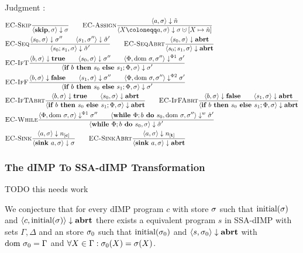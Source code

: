 \\
Judgment :
\begin{align*}
    &\bsrule{EC-Skip}{}{\bigstep{\skipcmd}{\store}{\store}}\qquad
    \bsrule{EC-Assign}{\bigstep{a}{\store}{\flaggedn{}}}
    {\bigstep{\defaultstore}{\store}{\storeassign{\store}{X \mapsto \flaggedn{}}}} \\
    &\bsrule{EC-Seq}{\bigstep{s_0}{\sigma}{\store''} \qquad \bigstep{s_1}{\store''}{\excstore'}}
    {\bigstep{\defaultssaseq}{\store}{\excstore'}}\qquad
    \bsrule{EC-SeqAbrt}{\bigstep{s_0}{\sigma}{\exception}}
    {\bigstep{\defaultssaseq}{\store}{\exception}} \\
    &\bsrule{EC-IfT}{\bigstep{b}{\store}{\btrue}\qquad \bigstep{s_0}{\store}{\store''}
    \qquad \bigsteppl{\philist}{\dom\store}{\store''}{\store'}}
    {\bigstep{\defaultssaif}{\store}{\store'}}\\
    &\bsrule{EC-IfF}{\bigstep{b}{\store}{\bfalse}\qquad \bigstep{s_1}{\store}{\store''}
    \qquad \bigsteppr{\philist}{\dom\store}{\store''}{\store'}}
    {\bigstep{\defaultssaif}{\store}{\store'}}\\
    &\bsrule{EC-IfTAbrt}{\bigstep{b}{\store}{\btrue}\qquad \bigstep{s_0}{\store}{\exception}}
    {\bigstep{\defaultssaif}{\store}{\exception}} \qquad
    \bsrule{EC-IfFAbrt}{\bigstep{b}{\store}{\bfalse}\qquad \bigstep{s_1}{\store}{\exception}}
    {\bigstep{\defaultssaif}{\store}{\exception}} \\
    &\bsrule{EC-While}{\bigsteppl{\philist}{\dom\store}{\store}{\store''} \qquad
    \bigstepw{\defaultssawhile}{\dom\store}{\store''}{\excstore'}}
    {\bigstep{\defaultssawhile}{\store}{\excstore'}}\\
    &\bsrule{EC-Sink}{\bigstep{a}{\store}{\clean{}}}
    {\bigstep{\defaultsink}{\store}{\store}}\qquad
    \bsrule{EC-SinkAbrt}{\bigstep{a}{\store}{\tracked{}}}
    {\bigstep{\defaultsink}{\store}{\exception}}\\
\end{align*}

\subsubsection*{The dIMP To SSA-dIMP Transformation}
\begin{conjecture}
    TODO this needs work
    
    We conjecture that for every dIMP program $c$ with store $\store$ 
    such that $\initialstore{}$ and $\bigstep{c}{\initialstore}{\exception}$ there exists a equivalent program
    $s$ in SSA-dIMP with sets $\Gamma, \Delta$ and an store $\store_0$ such that
     $\initialstore[\store_0]{}$ and $\bigstep{s}{\store_0}{\exception}$ with
    $\dom{\store_0} = \Gamma$ and $\forall X \in \Gamma: \store_0(X) = \store(X)$.
\end{conjecture}

